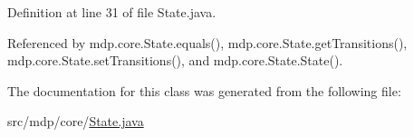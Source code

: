 Definition at line 31 of file State.\+java.



Referenced by mdp.\+core.\+State.\+equals(), mdp.\+core.\+State.\+get\+Transitions(), mdp.\+core.\+State.\+set\+Transitions(), and mdp.\+core.\+State.\+State().



The documentation for this class was generated from the following file\+:\begin{DoxyCompactItemize}
\item 
src/mdp/core/\hyperlink{_state_8java}{State.\+java}\end{DoxyCompactItemize}
